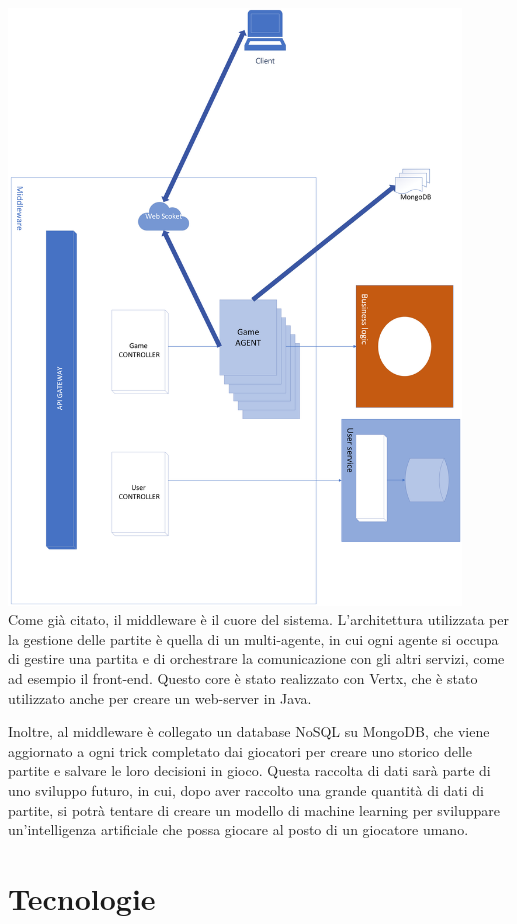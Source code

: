 \includegraphics[width=12cm]{report/img/middleware.png}\\[10.5cm]

Come già citato, il middleware è il cuore del sistema. L'architettura utilizzata per la gestione delle partite è quella di un multi-agente, in cui ogni agente si occupa di gestire una partita 
e di orchestrare la comunicazione con gli altri servizi, come ad esempio il front-end. Questo core è stato realizzato con Vertx, che è stato utilizzato anche per creare un web-server in Java.

Inoltre, al middleware è collegato un database NoSQL su MongoDB, che viene aggiornato a ogni trick completato dai giocatori per creare uno storico delle partite e salvare le loro decisioni in gioco. 
Questa raccolta di dati sarà parte di uno sviluppo futuro, in cui, dopo aver raccolto una grande quantità di dati di partite, si potrà tentare di creare un modello di machine learning per sviluppare un'intelligenza artificiale che possa giocare al posto di un giocatore umano.



\section{Tecnologie}
